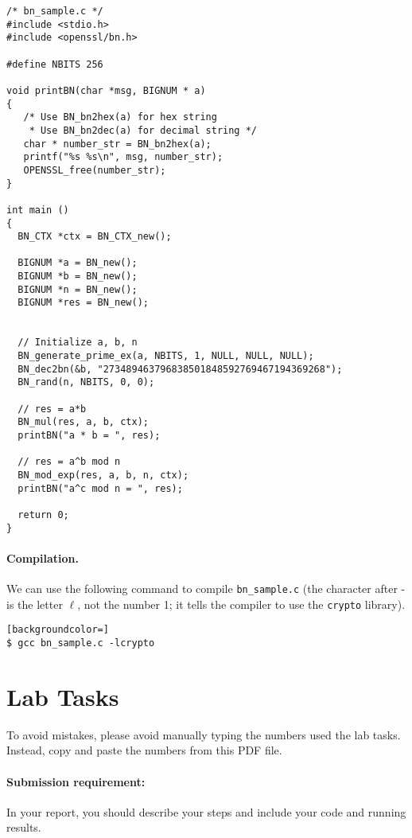 \begin{lstlisting}
/* bn_sample.c */
#include <stdio.h>
#include <openssl/bn.h>

#define NBITS 256

void printBN(char *msg, BIGNUM * a)
{
   /* Use BN_bn2hex(a) for hex string
    * Use BN_bn2dec(a) for decimal string */
   char * number_str = BN_bn2hex(a);
   printf("%s %s\n", msg, number_str);
   OPENSSL_free(number_str);
}

int main ()
{
  BN_CTX *ctx = BN_CTX_new();

  BIGNUM *a = BN_new();
  BIGNUM *b = BN_new();
  BIGNUM *n = BN_new();
  BIGNUM *res = BN_new();


  // Initialize a, b, n
  BN_generate_prime_ex(a, NBITS, 1, NULL, NULL, NULL);
  BN_dec2bn(&b, "273489463796838501848592769467194369268");
  BN_rand(n, NBITS, 0, 0);

  // res = a*b
  BN_mul(res, a, b, ctx);
  printBN("a * b = ", res);

  // res = a^b mod n
  BN_mod_exp(res, a, b, n, ctx);
  printBN("a^c mod n = ", res);

  return 0;
}
\end{lstlisting}
 


\paragraph{Compilation.} We can use the following command to
compile \texttt{bn\_sample.c} (the
character after - is the letter $\ell$, not the number 1; it tells the compiler to use the
\texttt{crypto} library).

\begin{lstlisting}[backgroundcolor=]
$ gcc bn_sample.c -lcrypto
\end{lstlisting}
 


\section{Lab Tasks}


To avoid mistakes, please avoid manually typing the numbers used the lab tasks. 
Instead, copy and paste the numbers from this PDF file. 


\paragraph{Submission requirement:} In your report, you should describe your steps and include
your code and running results. 


